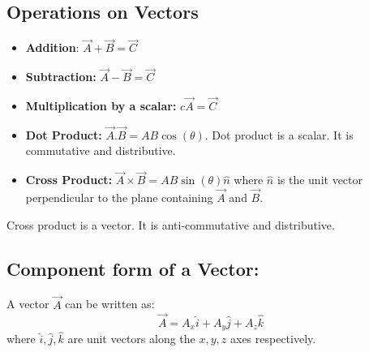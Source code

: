 \documentclass{article}
\begin{document}
\subsection{Operations on Vectors}
\begin{itemize}
	\item \textbf{Addition}: $\vec{A} + \vec{B} = \vec{C}$
	      \begin{figure}[H]
	      \end{figure}

	\item \textbf{Subtraction:} $\vec{A} - \vec{B} = \vec{C}$
	      \begin{figure}[H]
	      \end{figure}

	\item \textbf{Multiplication by a scalar: } $c\vec{A} = \vec{C}$
	\item \textbf{Dot Product: } $\vec{A}.\vec{B} = AB\cos(\theta)$.
	      Dot product is a scalar. It is commutative and distributive.
	\item \textbf{Cross Product: } $\vec{A} \times \vec{B} = AB\sin(\theta) \hat{n}$
	      where $\hat{n}$ is the unit vector perpendicular to the plane containing $\vec{A}$ and $\vec{B}$.
\end{itemize}

Cross product is a vector. It is anti-commutative and distributive.
\subsection{Component form of a Vector: }
A vector $\vec{A}$ can be written as:
\[\vec{A} = A_x \hat{i} + A_y \hat{j} + A_z \hat{k}\]
where $\hat{i}, \hat{j}, \hat{k}$ are unit vectors along the $x, y, z$ axes respectively.
\end{document}
